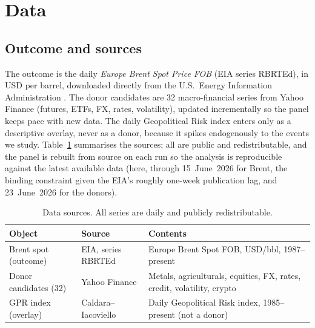 \documentclass[11pt,a4paper]{article}
\begin{document}
\section{Data}\label{sec:data}
\subsection{Outcome and sources}
The outcome is the daily \emph{Europe Brent Spot Price FOB} (EIA series RBRTEd), in
USD per barrel, downloaded directly from the U.S.\ Energy Information Administration
\citep{eia_brent}. The donor candidates are 32 macro-financial series from Yahoo
Finance (futures, ETFs, FX, rates, volatility), updated incrementally so the panel
keeps pace with new data. The \citet{caldara2022} daily Geopolitical Risk index enters
only as a descriptive overlay, never as a donor, because it spikes endogenously to the
events we study. Table~\ref{tab:sources} summarises the sources; all are public and
redistributable, and the panel is rebuilt from source on each run so the analysis is
reproducible against the latest available data (here, through 15~June~2026 for Brent,
the binding constraint given the EIA's roughly one-week publication lag, and
23~June~2026 for the donors).

\begin{table}[h]
\centering
\caption{Data sources. All series are daily and publicly redistributable.}
\label{tab:sources}
\small
\begin{tabular}{@{}p{3.0cm}p{3.6cm}p{7.0cm}@{}}
\toprule
Object & Source & Contents \\
\midrule
Brent spot (outcome) & EIA, series RBRTEd & Europe Brent Spot FOB, USD/bbl, 1987--present\\
Donor candidates (32) & Yahoo Finance & Metals, agriculturals, equities, FX, rates, credit, volatility, crypto\\
GPR index (overlay) & Caldara--Iacoviello & Daily Geopolitical Risk index, 1985--present (not a donor)\\
\bottomrule
\end{tabular}
\end{table}
\end{document}
